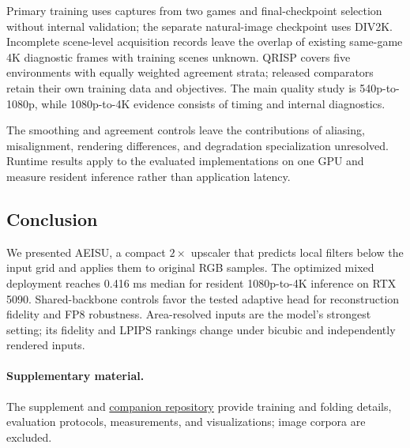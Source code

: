\documentclass[10pt,twocolumn,letterpaper]{article}
\newcommand{\model}{AEISU}
\begin{document}
Primary training uses captures from two games and final-checkpoint selection without internal validation; the separate natural-image checkpoint uses DIV2K.
Incomplete scene-level acquisition records leave the overlap of existing same-game 4K diagnostic frames with training scenes unknown.
QRISP covers five environments with equally weighted agreement strata; released comparators retain their own training data and objectives.
The main quality study is 540p-to-1080p, while 1080p-to-4K evidence consists of timing and internal diagnostics.

The smoothing and agreement controls leave the contributions of aliasing, misalignment, rendering differences, and degradation specialization unresolved.
Runtime results apply to the evaluated implementations on one GPU and measure resident inference rather than application latency.
\begin{samepage}
\section{Conclusion}
We presented \model{}, a compact $2\times$ upscaler that predicts local filters below the input grid and applies them to original RGB samples.
The optimized mixed deployment reaches 0.416 ms median for resident 1080p-to-4K inference on RTX 5090.
Shared-backbone controls favor the tested adaptive head for reconstruction fidelity and FP8 robustness.
Area-resolved inputs are the model's strongest setting; its fidelity and LPIPS rankings change under bicubic and independently rendered inputs.\par
\end{samepage}

\paragraph{Supplementary material.}
The supplement and \href{https://github.com/AELabs42/AEISU}{companion repository} provide training and folding details, evaluation protocols, measurements, and visualizations; image corpora are excluded.
\end{document}
